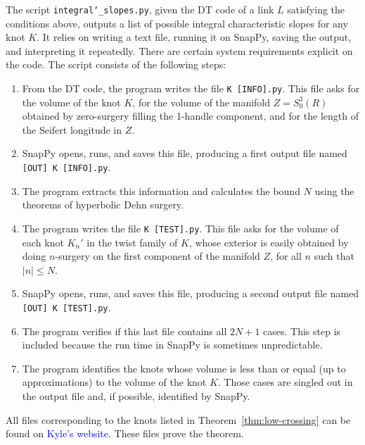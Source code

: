 \documentclass[11pt,usenames,dvipsnames,reqno]{amsart}
\numberwithin{theorem}{section}
\theoremstyle{ex}
\theoremstyle{rem}
\def\kh#1{\textcolor{Blue}{#1}}
\begin{document}
The script \texttt{integral\char`_slopes.py}, given the DT code of a link $L$ satisfying the conditions above, outputs a list of possible integral characteristic slopes for any knot $K$. It relies on writing a text file, running it on SnapPy, saving the output, and interpreting it repeatedly. There are certain system requirements explicit on the code. The script consists of the following steps:

\begin{enumerate}
	\item From the DT code, the program writes the file \texttt{K [INFO].py}. This file asks for the volume of the knot $K$, for the volume of the manifold $Z = S_0^3(R)$ obtained by zero-surgery filling the 1-handle component, and for the length of the Seifert longitude in $Z$.
	\item SnapPy opens, runs, and saves this file, producing a first output file named \texttt{[OUT] K [INFO].py}.
	\item The program extracts this information and calculates the bound $N$ using the theorems of hyperbolic Dehn surgery.
	\item The program writes the file \texttt{K [TEST].py}. This file asks for the volume of each knot $K_{n}'$ in the twist family of $K$, whose exterior is easily obtained by doing $n$-surgery on the first component of the manifold $Z$, for all $n$ such that $|n| \leq N$.
	\item SnapPy opens, runs, and saves this file, producing a second output file named \texttt{[OUT] K [TEST].py}.
	\item The program verifies if this last file contains all $2 N + 1$ cases. This step is included because the run time in SnapPy is sometimes unpredictable.
	\item The program identifies the knots whose volume is less than or equal (up to approximations) to the volume of the knot $K$. Those cases are singled out in the output file and, if possible, identified by SnapPy.
\end{enumerate}

All files corresponding to the knots listed in Theorem~\ref{thm:low-crossing} can be found on \kh{Kyle's website}. These files prove the theorem.
\end{document}
